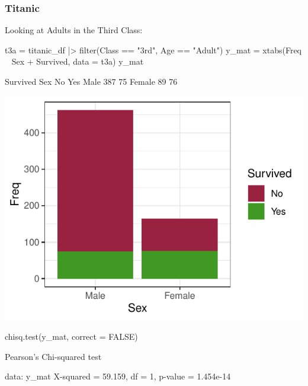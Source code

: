 \documentclass[a4paper]{article}\usepackage[]{graphicx}\usepackage[]{xcolor}
\makeatletter
\def\maxwidth{ %
  \ifdim\Gin@nat@width>\linewidth
    \linewidth
  \else
    \Gin@nat@width
  \fi
}
\makeatother
\begin{document}
\subsubsection{Titanic}
Looking at Adults in the Third Class:
\begin{Schunk}
\begin{Sinput}
t3a = titanic_df |> 
  filter(Class == "3rd", Age == "Adult")
y_mat = xtabs(Freq ~ Sex + Survived, data = t3a)
y_mat
\end{Sinput}
\begin{Soutput}
        Survived
Sex       No Yes
  Male   387  75
  Female  89  76
\end{Soutput}


{\centering \includegraphics[width=\maxwidth]{figure/listings-unnamed-chunk-44-1} 

}

\begin{Sinput}
chisq.test(y_mat, correct = FALSE)
\end{Sinput}
\begin{Soutput}

	Pearson's Chi-squared test

data:  y_mat
X-squared = 59.159, df = 1, p-value = 1.454e-14
\end{Soutput}
\end{Schunk}
\end{document}
